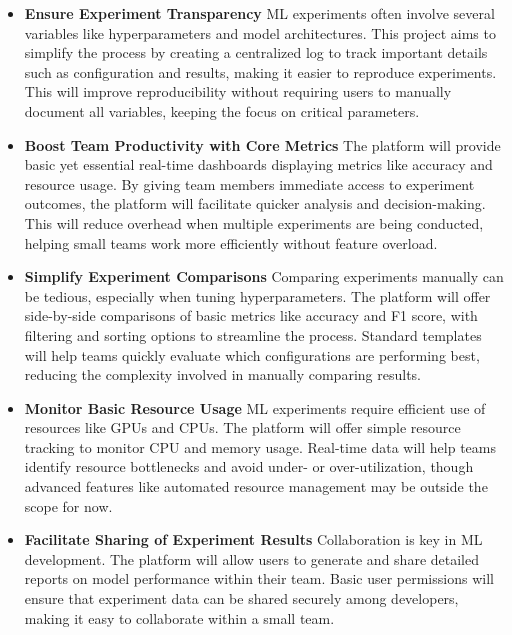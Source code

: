 \documentclass[12pt]{article}
\begin{document}
\begin{itemize}
\item \textbf{Ensure Experiment Transparency}
ML experiments often involve several variables like hyperparameters and model architectures. This project aims to simplify the process by creating a centralized log to track important details such as configuration and results, making it easier to reproduce experiments. This will improve reproducibility without requiring users to manually document all variables, keeping the focus on critical parameters.

\item \textbf{Boost Team Productivity with Core Metrics}
The platform will provide basic yet essential real-time dashboards displaying metrics like accuracy and resource usage. By giving team members immediate access to experiment outcomes, the platform will facilitate quicker analysis and decision-making. This will reduce overhead when multiple experiments are being conducted, helping small teams work more efficiently without feature overload.

\item \textbf{Simplify Experiment Comparisons}
Comparing experiments manually can be tedious, especially when tuning hyperparameters. The platform will offer side-by-side comparisons of basic metrics like accuracy and F1 score, with filtering and sorting options to streamline the process. Standard templates will help teams quickly evaluate which configurations are performing best, reducing the complexity involved in manually comparing results.

\item \textbf{Monitor Basic Resource Usage}
ML experiments require efficient use of resources like GPUs and CPUs. The platform will offer simple resource tracking to monitor CPU and memory usage. Real-time data will help teams identify resource bottlenecks and avoid under- or over-utilization, though advanced features like automated resource management may be outside the scope for now.

\item \textbf{Facilitate Sharing of Experiment Results}
Collaboration is key in ML development. The platform will allow users to generate and share detailed reports on model performance within their team. Basic user permissions will ensure that experiment data can be shared securely among developers, making it easy to collaborate within a small team.

\end{itemize}
\end{document}
